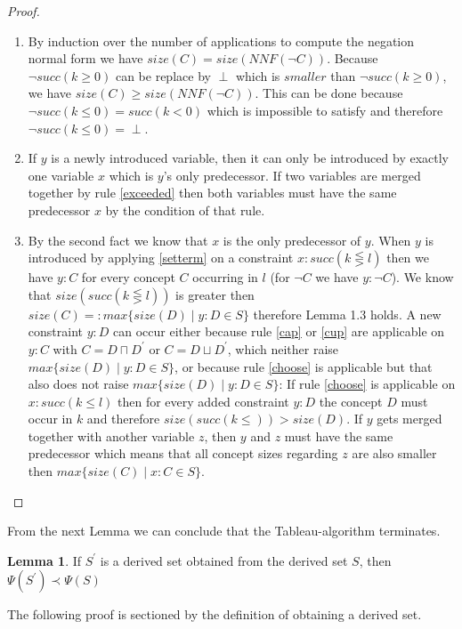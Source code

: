 \documentclass[a4paper,11pt]{scrartcl}
\theoremstyle{break}
\theoremstyle{definition}
\newtheorem{mylem}{Lemma}
\begin{document}
\begin{proof}$ $\\
\vspace*{-5mm}
\begin{enumerate}
\item By induction over the number of applications to compute the negation normal form we have $size(C)=size(NNF(\neg C))$. Because $\neg succ(k\geq0)$ can be replace by $\perp$ which is $smaller$ than $\neg succ(k\geq 0)$, we have $size(C)\geq size(NNF(\neg C))$. This can be done because $\neg succ(k\leq 0)= succ(k<0)$ which is impossible to satisfy and therefore $\neg succ(k\leq 0)=\perp$.
\item If $y$ is a newly introduced variable, then it can only be introduced by exactly one variable $x$ which is $y$'s only predecessor. If two variables are merged together by rule \ref{exceeded} then both variables must have the same predecessor $x$ by the condition of that rule.
\item By the second fact we know that $x$ is the only predecessor of $y$. When $y$ is introduced by applying \ref{setterm} on a constraint $x:succ(k\lesseqgtr l)$ then we have $y:C$ for every concept $C$ occurring in $l$ (for $\neg C$ we have $y:\neg C$). We know that $size(succ(k\lesseqgtr l))$ is greater then $size(C)=:max\{size(D)\mid y:D\in S\}$ therefore Lemma 1.3 holds. A new constraint $y:D$ can occur either because rule \ref{cap} or \ref{cup} are applicable on $y:C$ with $C=D\sqcap D^\prime$ or $C=D\sqcup D^\prime$, which neither raise $max\{size(D)\mid y:D \in S\}$, or because rule \ref{choose} is applicable but that also does not raise $max\{size(D)\mid y:D \in S\}$: If rule \ref{choose} is applicable on $x:succ(k\leq l)$ then for every added constraint $y:D$ the concept $D$ must occur in $k$ and therefore $size(succ(k\leq))>size(D)$. If $y$ gets merged together with another variable $z$, then $y$ and $z$ must have the same predecessor which means that all concept sizes regarding $z$ are also smaller then $max\{size(C)\mid x:C\in S\}$. 
\end{enumerate}
\end{proof}
From the next Lemma we can conclude that the Tableau-algorithm terminates.
\begin{mylem}
If $S^\prime$ is a derived set obtained from the derived set $S$, then $\Psi(S^\prime)\prec\Psi(S)$
\end{mylem}
The following proof is sectioned by the definition of obtaining a derived set.
\end{document}

